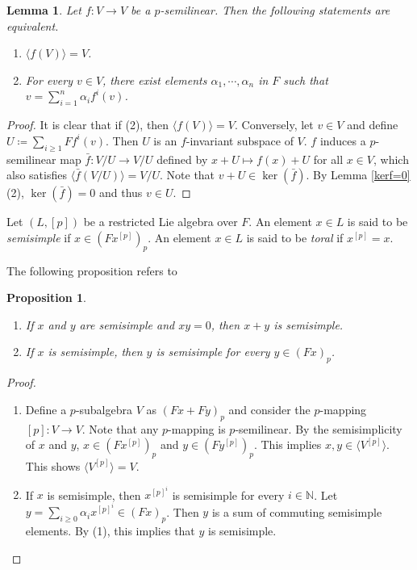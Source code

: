 \documentclass[12pt,MSc]{muthesis_2023}
\theoremstyle{plain}%
\newtheorem{Proposition}[FactCounter]{Proposition} %
\newtheorem{Lemma}[FactCounter]{Lemma} %
\theoremstyle{definition}
\theoremstyle{remark}
\begin{document}
\begin{Lemma}\label{p-semilinear<f(v)>=V}
Let $f:V\rightarrow V$ be a $p$-semilinear. Then the following statements are equivalent.
\begin{enumerate}
\item[(1)]
$\langle f(V) \rangle =V$.
\item[(2)]
For every $v\in V$, there exist elements $\alpha_1,\cdots, \alpha_n$ in $F$ such that $v=\sum_{i=1}^n \alpha_i f^i(v)$.
\end{enumerate}
\end{Lemma}
\begin{proof}
It is clear that if (2), then $\langle f(V) \rangle =V$. Conversely, let $v\in V$ and define $U \coloneqq \sum_{i \geq 1} Ff^i(v)$. Then $U$ is an $f$-invariant subspace of $V$. $f$ induces a $p$-semilinear map $\bar{f}: V/U \rightarrow V/U$ defined by $x+U \mapsto f(x)+U$ for all $x\in V$, which also satisfies $\langle \bar{f}(V/U)\rangle =V/U$. Note that $v+U \in \ker(\bar{f})$. By Lemma \ref{kerf=0} (2), $\ker (\bar{f})=0$ and thus $v\in U$.
\end{proof}

Let $(L, [p])$ be a restricted Lie algebra over $F$. An element $x\in L$ is said to be \textit{semisimple} if $x\in (Fx^{[p]})_p$. An element $x\in L$ is said to be \textit{toral} if $x^{[p]}=x$.

The following proposition refers to  \cite[Lemma 2.3.3]{SF}

\begin{Proposition}\label{ysemisimpleinFxp}
\begin{enumerate}
\item[(1)]
If $x$ and $y$ are semisimple and $xy=0$, then $x+y$ is semisimple.
\item[(2)]
If $x$ is semisimple, then $y$ is semisimple for every $y\in (Fx)_p$.
\end{enumerate}
\end{Proposition}

\begin{proof}
\begin{enumerate}
\item[(1)]
Define a $p$-subalgebra $V$ as $(Fx+Fy)_p$ and consider the $p$-mapping $[p]: V \rightarrow V$. Note that any $p$-mapping is $p$-semilinear. By the semisimplicity of $x$ and $y$, $x\in (Fx^{[p]})_p$ and $y\in (Fy^{[p]})_p$. This implies $x,y \in \langle V^{[p]} \rangle$. This shows $\langle V^{[p]}\rangle=V$.
\item[(2)]
If $x$ is semisimple, then $x^{[p]^i}$ is semisimple for every $i\in \mathbb{N}$. Let $y=\sum_{i\geq 0} \alpha_i x^{[p]^i}\in (Fx)_p$. Then $y$ is a sum of commuting semisimple elements. By (1), this implies that $y$ is semisimple.
\end{enumerate}
\end{proof}
\end{document}
